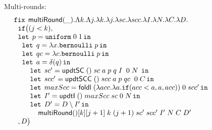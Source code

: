 \documentclass[a4paper,11pt]{article}
\theoremstyle{definition}
\begin{document}
\begin{figure}


Multi-rounds:
\[
\begin{array}{l}
 \mathop{\mathtt{fix}} \;  \mathsf{multiRound}(\_). \Lambda k. \Lambda j. \lambda k. \lambda j. \lambda sc. \lambda scc. \lambda
  I.   \lambda N. \lambda C. \lambda D.\\
 \hspace{.2cm} \mathtt{if}   \big (   (j < k)  ,  \\
  \hspace{.2cm} \mathop{\mathtt{let}} \; p = \mathtt{uniform} \; 0 \; 1 \mathop{ \mathtt{in}} \\
  \hspace{0.4cm} \mathop{\mathtt{let}} \; q = \lambda x. \mathtt{bernoulli} \; p \mathop{ \mathtt{in}} \\
 \hspace{0.4cm} \mathop{\mathtt{let}} \; qc = \lambda c. \mathtt{bernoulli} \; p \mathop{ \mathtt{in}} \\
 \hspace{0.4cm} \mathop{\mathtt{let}} \; a = \delta (q)  \mathop{ \mathtt{in}} \\
 \hspace{0.8cm} \mathop{\mathtt{let}} \; sc' =  \mathsf{updtSC} \; () \; sc  \; a \; p
 \; q \; I \;  \; 0 \;  N
  \;  \mathop{ \mathtt{in}} \\
\hspace{0.8cm} \mathop{\mathtt{let}} \; scc' =  \mathsf{updtSCC} \; () \; scc \; a \; p
 \; qc \;  \; 0 \;  C \mathop{ \mathtt{in}} \\
\hspace{0.8cm} \mathop{\mathtt{let}} \; maxScc =  \mathsf{foldl} \; (\lambda acc. \lambda a. \mathtt{if} ( acc < a, a, acc)) \; 0 \; scc' \mathop{ \mathtt{in}} \\
\hspace{0.8cm} \mathop{\mathtt{let}} \; I' =  \mathsf{updtI}  \; () \; maxScc \; sc
  \; 0 \; N  \mathop{ \mathtt{in}} \\
  \hspace{0.8cm} \mathop{\mathtt{let}} \; D' =  D \setminus I' \mathop{ \mathtt{in}} \\
  \hspace{1.2cm} \mathsf{multiRound} () [k] [j+1] \;  k \; (j+1)  \; sc' \; scc' \; I'
  \; N \; C \; D'\\ 
\hspace{0.2cm}   ,     D  \big ) \\
 
\end{array}
\]


\end{figure}
\end{document}
